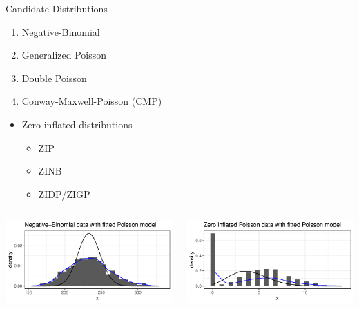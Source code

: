 \documentclass[
  ignorenonframetext,
]{beamer}
\providecommand{\tightlist}{%
  \setlength{\itemsep}{0pt}\setlength{\parskip}{0pt}}\usepackage{longtable,booktabs,array}
\begin{document}
\begin{frame}{Candidate Distributions}
\protect\hypertarget{candidate-distributions}{}
\begin{enumerate}
\tightlist
\item
  Negative-Binomial
\item
  Generalized Poisson
\item
  Double Poisson
\item
  Conway-Maxwell-Poisson (CMP)
\end{enumerate}

\begin{itemize}
\tightlist
\item
  Zero inflated distributions

  \begin{itemize}
  \tightlist
  \item
    ZIP
  \item
    ZINB
  \item
    ZIDP/ZIGP
  \end{itemize}
\end{itemize}

\begin{columns}[T]
\begin{column}{0.5\textwidth}
\includegraphics{cmp_pres_files/figure-beamer/unnamed-chunk-2-1.pdf}
\end{column}

\begin{column}{0.5\textwidth}
\includegraphics{cmp_pres_files/figure-beamer/unnamed-chunk-3-1.pdf}
\end{column}
\end{columns}
\end{frame}
\end{document}
